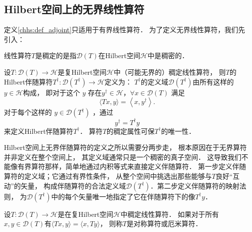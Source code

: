 
\subsection{Hilbert空间上的无界线性算符}

定义\ref{chhs:def_adjoint}只适用于有界线性算符．
为了定义无界线性算符，我们先引入：


\begin{definition}
	线性算符$T$是{\heiti 稠定的}是指$\mathscr{D}(T)$在Hilbert空间$\mathcal{H}$中是稠密的．
\end{definition}


\begin{definition}
	设$T: \mathscr{D}(T) \rightarrow \mathcal{H}$是复Hilbert空间$\mathcal{H}$中（可能无界的）稠定线性算符，
	则$T$的Hilbert伴随算符$T^{\dagger}: \mathscr{D}\left(T^{\dagger}\right)\rightarrow \mathcal{H}$定义为：
	$T^{\dagger}$的定义域$\mathscr{D}\left(T^{\dagger}\right)$由所有这样的$y \in \mathcal{H}$构成，
	即对于这个 $y$ 存在$y^{\dagger} \in \mathcal{H}$，$\forall x \in \mathscr{D}(T)$ 满足
	\begin{equation}
		\langle T x, y\rangle=\left\langle x, y^{\dagger}\right\rangle . 
	\end{equation}
	对于每个这样的 $y \in \mathscr{D}\left(T^{\dagger}\right)$ ，通过
	\begin{equation}
		y^{\dagger}=T^{\dagger} y
	\end{equation}
	来定义Hilbert伴随算符$T^{\dagger}$．
	算符$T$的稠定属性可保$T^{\dagger}$的唯一性．
\end{definition}



Hilbert空间上无界伴随算符的定义之所以需要分两步走，
根本原因在于无界算符并非定义在整个空间上，
其定义域通常只是一个稠密的真子空间．
这导致我们不能像有界算符那样，简单地通过内积等式来直接定义伴随算符．
第一步定义伴随算符的定义域；它通过有界性条件，
从整个空间中挑选出那些能够与$T$良好“互动”的矢量，
构成伴随算符的合法定义域$\mathscr{D}(T^{\dagger})$．第二步定义伴随算符的映射法则，
为$\mathscr{D}(T^{\dagger})$中的每个矢量唯一地指定了它在伴随算符下的像$T^\dagger y$．

  

\begin{definition}\label{chhs:def_symO}
	设$T: \mathscr{D}(T) \rightarrow \mathcal{H}$是在复Hilbert空间$\mathcal{H}$中稠定线性算符．
	如果对于所有$x, y \in \mathscr{D}(T)$有$\langle T x, y\rangle=\langle x, T y\rangle$，
	则称$T$是{\heiti 对称算符}或{\heiti 厄米算符}．
\end{definition}

